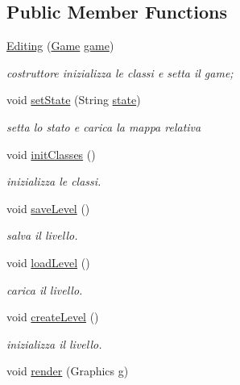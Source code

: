 \subsection*{Public Member Functions}
\begin{DoxyCompactItemize}
\item 
\hyperlink{classscenes_1_1_editing_a2ca3ef24637fa4a614988adee4b8689d}{Editing} (\hyperlink{classprogetto_1_1_game}{Game} \hyperlink{classscenes_1_1_game_scene_ac6a5ed6191fcf3a5bf0445921feb4f48}{game})
\begin{DoxyCompactList}\small\item\em costruttore inizializza le classi e setta il game; \end{DoxyCompactList}\item 
void \hyperlink{classscenes_1_1_editing_ae646a5c5937b560efaa2b7bb675bc3cd}{set\+State} (String \hyperlink{classscenes_1_1_editing_a91ac952876f776b3fbbc8519e093fdbf}{state})
\begin{DoxyCompactList}\small\item\em setta lo stato e carica la mappa relativa \end{DoxyCompactList}\item 
void \hyperlink{classscenes_1_1_editing_afe125d345675ffefe8da7e96d39773f3}{init\+Classes} ()
\begin{DoxyCompactList}\small\item\em inizializza le classi. \end{DoxyCompactList}\item 
void \hyperlink{classscenes_1_1_editing_af1c1bf274cd89c18726a992a073a7c6d}{save\+Level} ()
\begin{DoxyCompactList}\small\item\em salva il livello. \end{DoxyCompactList}\item 
void \hyperlink{classscenes_1_1_editing_a286931cc46e197f4a85af7229fdc29a4}{load\+Level} ()
\begin{DoxyCompactList}\small\item\em carica il livello. \end{DoxyCompactList}\item 
void \hyperlink{classscenes_1_1_editing_ad79f312dd3a9e52f38a9e5f1536537fd}{create\+Level} ()
\begin{DoxyCompactList}\small\item\em inizializza il livello. \end{DoxyCompactList}\item 
void \hyperlink{classscenes_1_1_editing_a203b6ad9d5e4d54dd1152986eec4dedc}{render} (Graphics g)

\end{DoxyCompactItemize}
